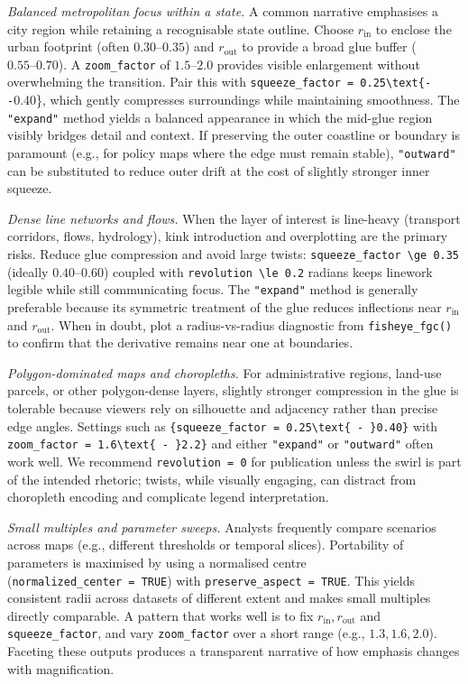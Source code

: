 \emph{Balanced metropolitan focus within a state.} A common narrative emphasises a city region while
retaining a recognisable state outline. Choose \(r_{\text{in}}\) to enclose the urban footprint (often
\(0.30\text{--}0.35\)) and \(r_{\text{out}}\) to provide a broad glue buffer
(\(0.55\text{--}0.70\)). A \texttt{zoom\_factor} of \(1.5\text{--}2.0\) provides visible enlargement
without overwhelming the transition. Pair this with \texttt{squeeze\_factor\ =\ 0.25\textbackslash{}text\{-\/-}0.40\}, which
gently compresses surroundings while maintaining smoothness. The \texttt{"expand"} method yields a
balanced appearance in which the mid-glue region visibly bridges detail and context. If preserving the
outer coastline or boundary is paramount (e.g., for policy maps where the edge must remain stable),
\texttt{"outward"} can be substituted to reduce outer drift at the cost of slightly stronger inner
squeeze.

\emph{Dense line networks and flows.} When the layer of interest is line-heavy (transport corridors,
flows, hydrology), kink introduction and overplotting are the primary risks. Reduce glue compression
and avoid large twists: \texttt{squeeze\_factor\ \textbackslash{}ge\ 0.35} (ideally \(0.40\text{--}0.60\)) coupled with
\texttt{revolution\ \textbackslash{}le\ 0.2} radians keeps linework legible while still communicating focus. The
\texttt{"expand"} method is generally preferable because its symmetric treatment of the glue reduces
inflections near \(r_{\text{in}}\) and \(r_{\text{out}}\). When in doubt, plot a radius-vs-radius
diagnostic from \texttt{fisheye\_fgc()} to confirm that the derivative remains near one at boundaries.

\emph{Polygon-dominated maps and choropleths.} For administrative regions, land-use parcels, or other
polygon-dense layers, slightly stronger compression in the glue is tolerable because viewers rely on
silhouette and adjacency rather than precise edge angles. Settings such as \texttt{\{squeeze\_factor\ =\ 0.25\textbackslash{}text\{\ -\ \}0.40\}} with \texttt{zoom\_factor\ =\ 1.6\textbackslash{}text\{\ -\ \}2.2\}} and either \texttt{"expand"} or
\texttt{"outward"} often work well. We recommend \texttt{revolution\ =\ 0} for publication unless the swirl
is part of the intended rhetoric; twists, while visually engaging, can distract from choropleth
encoding and complicate legend interpretation.

\emph{Small multiples and parameter sweeps.} Analysts frequently compare scenarios across maps (e.g.,
different thresholds or temporal slices). Portability of parameters is maximised by using a
normalised centre (\texttt{normalized\_center\ =\ TRUE}) with \texttt{preserve\_aspect\ =\ TRUE}. This yields
consistent radii across datasets of different extent and makes small multiples directly comparable. A
pattern that works well is to fix \(r_{\text{in}}, r_{\text{out}}\) and \texttt{squeeze\_factor}, and vary
\texttt{zoom\_factor} over a short range (e.g., \(1.3, 1.6, 2.0\)). Faceting these outputs produces a
transparent narrative of how emphasis changes with magnification.

